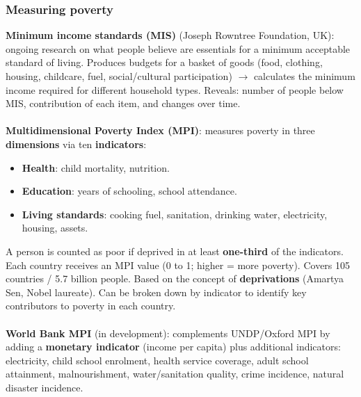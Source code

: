 \documentclass[a4paper,12pt]{article}
\begin{document}
\subsubsection*{Measuring poverty}
\textbf{Minimum income standards (MIS)} (Joseph Rowntree Foundation, UK): ongoing research on what people believe are essentials for a minimum acceptable standard of living. Produces budgets for a basket of goods (food, clothing, housing, childcare, fuel, social/cultural participation) $\to$ calculates the minimum income required for different household types. Reveals: number of people below MIS, contribution of each item, and changes over time.
\\\\
\textbf{Multidimensional Poverty Index (MPI)}: measures poverty in three \textbf{dimensions} via ten \textbf{indicators}:
\begin{itemize}
  \item \textbf{Health}: child mortality, nutrition.
  \item \textbf{Education}: years of schooling, school attendance.
  \item \textbf{Living standards}: cooking fuel, sanitation, drinking water, electricity, housing, assets.
\end{itemize}
A person is counted as poor if deprived in at least \textbf{one-third} of the indicators. Each country receives an MPI value (0 to 1; higher = more poverty). Covers 105 countries / 5.7 billion people. Based on the concept of \textbf{deprivations} (Amartya Sen, Nobel laureate). Can be broken down by indicator to identify key contributors to poverty in each country.
\\\\
\textbf{World Bank MPI} (in development): complements UNDP/Oxford MPI by adding a \textbf{monetary indicator} (income per capita) plus additional indicators: electricity, child school enrolment, health service coverage, adult school attainment, malnourishment, water/sanitation quality, crime incidence, natural disaster incidence.
\end{document}
